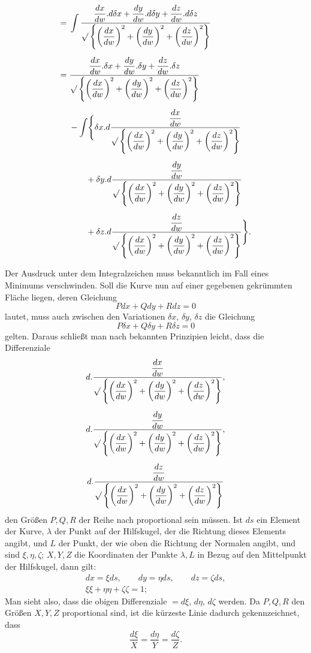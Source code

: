 %
\[
\begin{aligned}
={}&\int\frac{\dfrac{dx}{dw}.d\delta x+\dfrac{dy}{dw}.d\delta y+\dfrac{dz}{dw}.d\delta z}{\mathord{\surd}\left\{\left(\dfrac{dx}{dw}\right)^{2}+\left(\dfrac{dy}{dw}\right)^{2}+\left(\dfrac{dz}{dw}\right)^{2}\right\}}\\[5pt]
={}&\frac{\dfrac{dx}{dw}.\delta x+\dfrac{dy}{dw}.\delta y+\dfrac{dz}{dw}.\delta z}{\mathord{\surd}\left\{\left(\dfrac{dx}{dw}\right)^{2}+\left(\dfrac{dy}{dw}\right)^{2}+\left(\dfrac{dz}{dw}\right)^{2}\right\}}\\[5pt]
&-\int\Biggl\{\delta x.d\frac{\dfrac{dx}{dw}}{\mathord{\surd}\left\{\left(\dfrac{dx}{dw}\right)^{2}+\left(\dfrac{dy}{dw}\right)^{2}+\left(\dfrac{dz}{dw}\right)^{2}\right\}}\\[5pt]
&\qquad+\delta y.d\frac{\dfrac{dy}{dw}}{\mathord{\surd}\left\{\left(\dfrac{dx}{dw}\right)^{2}+\left(\dfrac{dy}{dw}\right)^{2}+\left(\dfrac{dz}{dw}\right)^{2}\right\}}\\[5pt]
&\qquad+\delta z.d\frac{\dfrac{dz}{dw}}{\mathord{\surd}\left\{\left(\dfrac{dx}{dw}\right)^{2}+\left(\dfrac{dy}{dw}\right)^{2}+\left(\dfrac{dz}{dw}\right)^{2}\right\}}\Biggr\}.
\end{aligned}
\]

Der Ausdruck unter dem Integralzeichen muss bekanntlich im Fall eines Minimums verschwinden. Soll die Kurve nun auf einer gegebenen gekrümmten Fläche liegen, deren Gleichung
\[
Pdx+Qdy+Rdz=0
\]
lautet, muss auch zwischen den Variationen $\delta x$, $\delta y$, $\delta z$ die Gleichung
\[
P\delta x+Q\delta y+R\delta z=0
\]
gelten. Daraus schließt man nach bekannten Prinzipien leicht, dass die Differenziale
\[
\begin{gathered}
d.\frac{\dfrac{dx}{dw}}{\mathord{\surd}\left\{\left(\dfrac{dx}{dw}\right)^{2}+\left(\dfrac{dy}{dw}\right)^{2}+\left(\dfrac{dz}{dw}\right)^{2}\right\}},\\[5pt]
d.\frac{\dfrac{dy}{dw}}{\mathord{\surd}\left\{\left(\dfrac{dx}{dw}\right)^{2}+\left(\dfrac{dy}{dw}\right)^{2}+\left(\dfrac{dz}{dw}\right)^{2}\right\}},\\[5pt]
d.\frac{\dfrac{dz}{dw}}{\mathord{\surd}\left\{\left(\dfrac{dx}{dw}\right)^{2}+\left(\dfrac{dy}{dw}\right)^{2}+\left(\dfrac{dz}{dw}\right)^{2}\right\}}
\end{gathered}
\]
den Größen $P,Q,R$ der Reihe nach proportional sein müssen. Ist $ds$ ein Element der Kurve, $\lambda$ der Punkt auf der Hilfskugel, der die Richtung dieses Elements angibt, und $L$ der Punkt, der wie oben die Richtung der Normalen angibt, und sind $\xi,\eta,\zeta$; $X,Y,Z$ die Koordinaten der Punkte $\lambda,L$ in Bezug auf den Mittelpunkt der Hilfskugel, dann gilt:
\[
\begin{gathered}
dx=\xi ds,\qquad dy=\eta ds,\qquad dz=\zeta ds,\\
\xi\xi+\eta\eta+\zeta\zeta=1;
\end{gathered}
\]
Man sieht also, dass die obigen Differenziale $=d\xi$, $d\eta$, $d\zeta$ werden. Da $P,Q,R$ den Größen $X,Y,Z$ proportional sind, ist die kürzeste Linie dadurch gekennzeichnet, dass
\[
\frac{d\xi}{X}=\frac{d\eta}{Y}=\frac{d\zeta}{Z}.
\]
